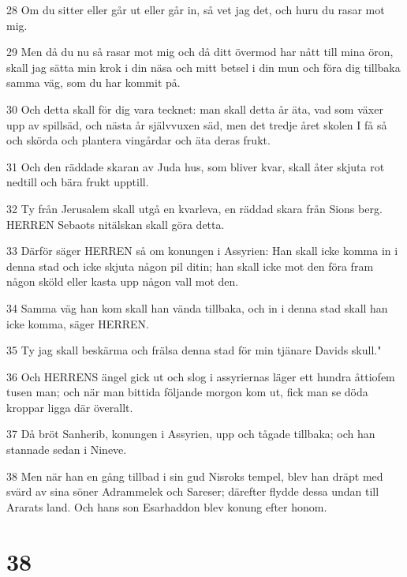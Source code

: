 \par 28 Om du sitter eller går ut eller går in, så vet jag det, och huru du rasar mot mig.
\par 29 Men då du nu så rasar mot mig och då ditt övermod har nått till mina öron, skall jag sätta min krok i din näsa och mitt betsel i din mun och föra dig tillbaka samma väg, som du har kommit på.
\par 30 Och detta skall för dig vara tecknet: man skall detta år äta, vad som växer upp av spillsäd, och nästa år självvuxen säd, men det tredje året skolen I få så och skörda och plantera vingårdar och äta deras frukt.
\par 31 Och den räddade skaran av Juda hus, som bliver kvar, skall åter skjuta rot nedtill och bära frukt upptill.
\par 32 Ty från Jerusalem skall utgå en kvarleva, en räddad skara från Sions berg. HERREN Sebaots nitälskan skall göra detta.
\par 33 Därför säger HERREN så om konungen i Assyrien: Han skall icke komma in i denna stad och icke skjuta någon pil ditin; han skall icke mot den föra fram någon sköld eller kasta upp någon vall mot den.
\par 34 Samma väg han kom skall han vända tillbaka, och in i denna stad skall han icke komma, säger HERREN.
\par 35 Ty jag skall beskärma och frälsa denna stad för min tjänare Davids skull."
\par 36 Och HERRENS ängel gick ut och slog i assyriernas läger ett hundra åttiofem tusen man; och när man bittida följande morgon kom ut, fick man se döda kroppar ligga där överallt.
\par 37 Då bröt Sanherib, konungen i Assyrien, upp och tågade tillbaka; och han stannade sedan i Nineve.
\par 38 Men när han en gång tillbad i sin gud Nisroks tempel, blev han dräpt med svärd av sina söner Adrammelek och Sareser; därefter flydde dessa undan till Ararats land. Och hans son Esarhaddon blev konung efter honom.

\chapter{38}


